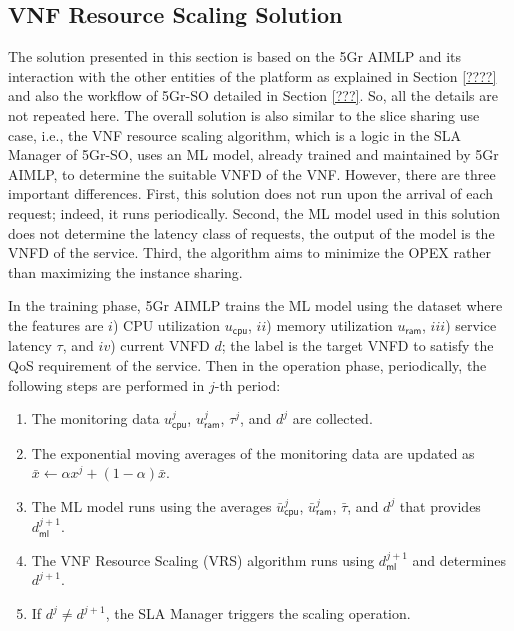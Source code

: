 \documentclass[conference, final]{IEEEtran}
\newcommand{\hlb}[2][blue]{{\color{#1} {#2}}\unskip }
\begin{document}
\subsection{VNF Resource Scaling Solution}
\label{sec:Resource-Scaling}
\hlb{


The solution presented in this section is based on the 5Gr AIMLP and its interaction with the other entities of the platform as explained in Section \ref{????} and also the workflow of 5Gr-SO detailed in Section \ref{???}. So, all the details are not repeated here. The overall solution is also similar to the slice sharing use case, i.e., the VNF resource scaling algorithm, which is a logic in the SLA Manager of 5Gr-SO, uses an ML model, already trained and maintained by 5Gr AIMLP, to determine the suitable VNFD of the VNF. However, there are three important differences. First, this solution does not run upon the arrival of each request; indeed, it runs periodically. Second, the ML model used in this solution does not determine the latency class of requests, the output of the model is the VNFD \text{to satisfy the QoS requirement} of the service. Third, the algorithm aims to minimize the OPEX rather than maximizing the instance sharing. 

In the training phase, 5Gr AIMLP trains the ML model using the dataset where the features are $i$) CPU utilization $u_{\textsf{cpu}}$, $ii$) memory utilization $u_{\textsf{ram}}$, $iii$) service latency $\tau$, and $iv$) current VNFD $d$; the label is the target VNFD to satisfy the QoS requirement of the service. Then in the operation phase, periodically, the following steps are performed in $j$-th period:
\begin{enumerate}
\item The monitoring data $u_{\textsf{cpu}}^{j}$, $u_{\textsf{ram}}^{j}$, $\tau^{j}$, and  $d^{j}$ are collected.
\item The exponential moving averages of the monitoring data are updated as $\bar{x} \leftarrow \alpha x^{j} + (1 - \alpha) \bar{x}$.
\item The ML model runs using the averages $\bar{u}_{\textsf{cpu}}^{j}$, $\bar{u}_{\textsf{ram}}^{j}$, $\bar{\tau}$, and $d^{j}$ that provides $d^{j+1}_{\textsf{ml}}$.
\item The VNF Resource Scaling (VRS) algorithm  runs using $d^{j+1}_{\textsf{ml}}$ and determines $d^{j+1}$.
\item If $d^{j} \neq d^{j+1}$, the SLA Manager triggers the  scaling  operation.
\end{enumerate}

}
\end{document}
